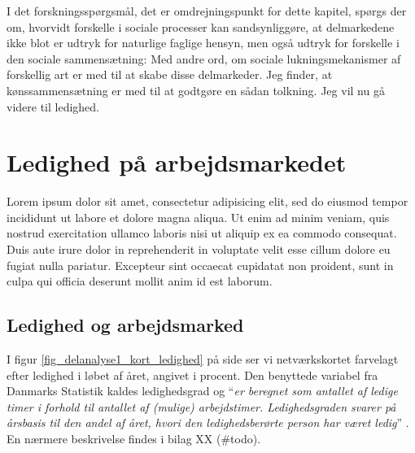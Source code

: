 I det forskningsspørgsmål, det er omdrejningspunkt for dette kapitel, spørgs der om, hvorvidt forskelle i sociale processer kan sandsynliggøre, at delmarkedene ikke blot er udtryk for naturlige faglige hensyn, men også udtryk for forskelle i den sociale sammensætning: Med andre ord, om sociale lukningsmekanismer af forskellig art er med til at skabe disse delmarkeder. Jeg finder, at kønssammensætning er med til at godtgøre en sådan tolkning. Jeg vil nu gå videre til ledighed. 


% 
% 
%
%







\section{Ledighed på arbejdsmarkedet \label{sec_delanalyse2 ledighed generelt}}


Lorem ipsum dolor sit amet, consectetur adipisicing elit, sed do eiusmod
tempor incididunt ut labore et dolore magna aliqua. Ut enim ad minim veniam,
quis nostrud exercitation ullamco laboris nisi ut aliquip ex ea commodo
consequat. Duis aute irure dolor in reprehenderit in voluptate velit esse
cillum dolore eu fugiat nulla pariatur. Excepteur sint occaecat cupidatat non
proident, sunt in culpa qui officia deserunt mollit anim id est laborum.



%
\subsection{Ledighed og arbejdsmarked}
%


I figur \ref{fig_delanalyse1_kort_ledighed} på side \pageref{fig_delanalyse1_kort_ledighed} ser vi netværkskortet farvelagt efter ledighed i løbet af året, angivet i procent. Den benyttede variabel fra Danmarks Statistik kaldes ledighedsgrad  og  “\emph{er beregnet som antallet af ledige timer i forhold til antallet af (mulige) arbejdstimer. Ledighedsgraden svarer på årsbasis til den andel af året, hvori den ledighedsberørte person har været ledig}” \parencite{DST-ARLEDGR}. En nærmere beskrivelse findes i bilag XX (\#todo). 

